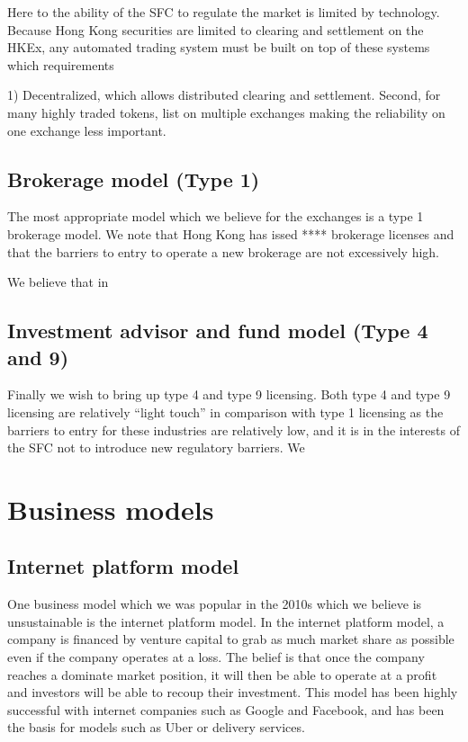 Here to the ability of the SFC to regulate the market is limited by
technology.  Because Hong Kong securities are limited to clearing and
settlement on the HKEx, any automated trading system must be built on
top of these systems which requirements

1) Decentralized, which allows distributed clearing and settlement.
Second, for many highly traded tokens, list on multiple exchanges
making the reliability on one exchange less important.

\subsection{Brokerage model (Type 1)}
The most appropriate model which we believe for the exchanges is a
type 1 brokerage model. We note that Hong Kong has issed ****
brokerage licenses and that the barriers to entry to operate a new
brokerage are not excessively high.

We believe that in 

\subsection{Investment advisor and fund model (Type 4 and 9)}
Finally we wish to bring up type 4 and type 9 licensing.  Both type 4
and type 9 licensing are relatively ``light touch'' in comparison with
type 1 licensing as the barriers to entry for these industries are
relatively low, and it is in the interests of the SFC not to introduce
new regulatory barriers.  We 


\section{Business models}

\subsection{Internet platform model}

One business model which we was popular in the 2010s which we believe
is unsustainable is the internet platform model.  In the internet
platform model, a company is financed by venture capital to grab as
much market share as possible even if the company operates at a loss.
The belief is that once the company reaches a dominate market
position, it will then be able to operate at a profit and investors
will be able to recoup their investment.  This model has been highly
successful with internet companies such as Google and Facebook, and
has been the basis for models such as Uber or delivery services.

